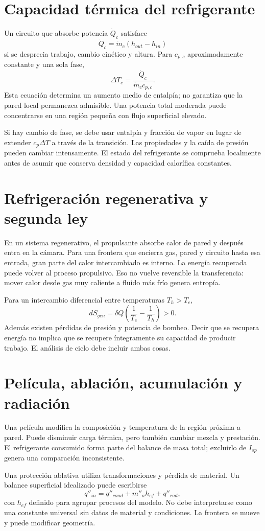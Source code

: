 \section{Capacidad térmica del refrigerante}
Un circuito que absorbe potencia $\dot Q_c$ satisface
\[
 \dot Q_c=\dot m_c(h_{out}-h_{in})
\]
si se desprecia trabajo, cambio cinético y altura. Para $c_{p,c}$ aproximadamente constante y una sola fase,
\[
 \Delta T_c=\frac{\dot Q_c}{\dot m_cc_{p,c}}.
\]
Esta ecuación determina un aumento medio de entalpía; no garantiza que la pared local permanezca admisible. Una potencia total moderada puede concentrarse en una región pequeña con flujo superficial elevado.

Si hay cambio de fase, se debe usar entalpía y fracción de vapor en lugar de extender $c_p\Delta T$ a través de la transición. Las propiedades y la caída de presión pueden cambiar intensamente. El estado del refrigerante se comprueba localmente antes de asumir que conserva densidad y capacidad calorífica constantes.
\section{Refrigeración regenerativa y segunda ley}
En un sistema regenerativo, el propulsante absorbe calor de pared y después entra en la cámara. Para una frontera que encierra gas, pared y circuito hasta esa entrada, gran parte del calor intercambiado es interno. La energía recuperada puede volver al proceso propulsivo. Eso no vuelve reversible la transferencia: mover calor desde gas muy caliente a fluido más frío genera entropía.

Para un intercambio diferencial entre temperaturas $T_h>T_c$,
\[
 dS_{gen}=\delta Q\left(\frac1{T_c}-\frac1{T_h}\right)>0.
\]
Además existen pérdidas de presión y potencia de bombeo. Decir que se recupera energía no implica que se recupere íntegramente su capacidad de producir trabajo. El análisis de ciclo debe incluir ambas cosas.\cite{MIT09}
\section{Película, ablación, acumulación y radiación}
Una película modifica la composición y temperatura de la región próxima a pared. Puede disminuir carga térmica, pero también cambiar mezcla y prestación. El refrigerante consumido forma parte del balance de masa total; excluirlo de $I_{sp}$ genera una comparación inconsistente.

Una protección ablativa utiliza transformaciones y pérdida de material. Un balance superficial idealizado puede escribirse
\[
 q''_{in}=q''_{cond}+\dot m''_a h_{ef}+q''_{rad},
\]
con $h_{ef}$ definido para agrupar procesos del modelo. No debe interpretarse como una constante universal sin datos de material y condiciones. La frontera se mueve y puede modificar geometría.

